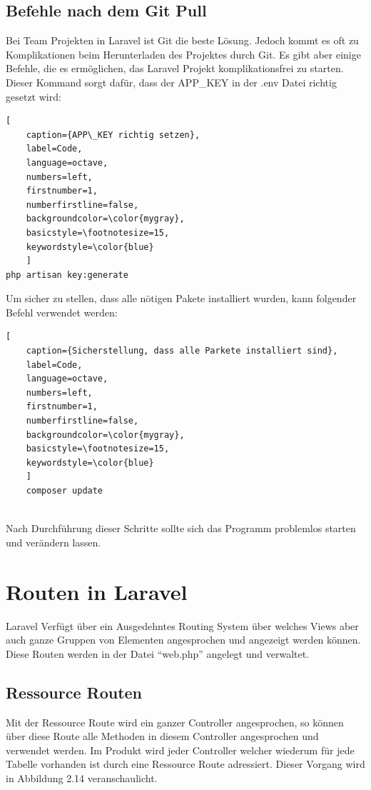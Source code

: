 \subsection{Befehle nach dem Git Pull} 
Bei Team Projekten in Laravel ist Git die beste Lösung. Jedoch kommt es oft zu Komplikationen beim Herunterladen des Projektes durch Git. Es gibt aber einige Befehle, die es ermöglichen, das Laravel Projekt komplikationsfrei zu starten.
Dieser Kommand sorgt dafür, dass der APP\_KEY in der .env Datei richtig gesetzt wird:
\begin{lstlisting}[
	caption={APP\_KEY richtig setzen},
	label=Code,
	language=octave,
	numbers=left,
	firstnumber=1,
	numberfirstline=false,
	backgroundcolor=\color{mygray},
	basicstyle=\footnotesize=15,
	keywordstyle=\color{blue}
	]
php artisan key:generate 

\end{lstlisting}
Um sicher zu stellen, dass alle nötigen Pakete installiert wurden, kann folgender Befehl verwendet werden:
\begin{lstlisting}[
	caption={Sicherstellung, dass alle Parkete installiert sind},
	label=Code,
	language=octave,
	numbers=left,
	firstnumber=1,
	numberfirstline=false,
	backgroundcolor=\color{mygray},
	basicstyle=\footnotesize=15,
	keywordstyle=\color{blue}
	]
	composer update
	
\end{lstlisting}
Nach Durchführung dieser Schritte sollte sich das Programm problemlos starten und verändern lassen.
\newpage


\section{Routen in Laravel}
Laravel Verfügt über ein Ausgedehntes Routing System über welches Views aber auch ganze Gruppen von Elementen angesprochen und angezeigt werden können. Diese Routen werden in der Datei “web.php” angelegt und verwaltet.
\subsection{Ressource Routen} 
Mit der Ressource Route wird ein ganzer Controller angesprochen, so können über diese Route alle Methoden in diesem Controller angesprochen und verwendet werden. Im Produkt wird jeder Controller welcher wiederum für jede Tabelle vorhanden ist durch eine Ressource Route adressiert. Dieser Vorgang wird in Abbildung 2.14 veranschaulicht.

